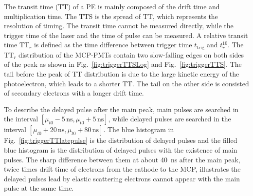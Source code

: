 The transit time (TT) of a PE is mainly composed of the drift time and multiplication time. The TTS is the spread of TT, which represents the resolution of timing. The transit time cannot be measured directly, while the trigger time of the laser and the time of pulse can be measured. A relative transit time $\mathrm{TT}_r$ is defined as the time difference between trigger time $t_{\mathrm{trig}}$ and $t_r^{10}$. The $\mathrm{TT}_r$ distribution of the MCP-PMTs contain two slow-falling edges on both sides of the peak as shown in Fig.~\ref{fig:triggerTTSLog} and Fig.~\ref{fig:triggerTTS}. The tail before the peak of TT distribution is due to the large kinetic energy of the photoelectron, which leads to a shorter TT. The tail on the other side is consisted of secondary electrons with a longer drift time.

To describe the delayed pulse after the main peak, main pulses are searched in the interval $[\mu_{t0}-5\,\mathrm{ns},\mu_{t0}+5\,\mathrm{ns}]$, while delayed pulses are searched in the interval $[\mu_{t0}+20\,\mathrm{ns},\mu_{t0}+80\,\mathrm{ns}]$. The blue histogram in Fig.~\ref{fig:triggerTTlatepulse} is the distribution of delayed pulses and the filled blue histogram is the distribution of delayed pulses with the existence of main pulses. The sharp difference between them at about \SI{40}{ns} after the main peak, twice times drift time of electrons from the cathode to the MCP, illustrates the delayed pulses lead by elastic scattering electrons cannot appear with the main pulse at the same time.

